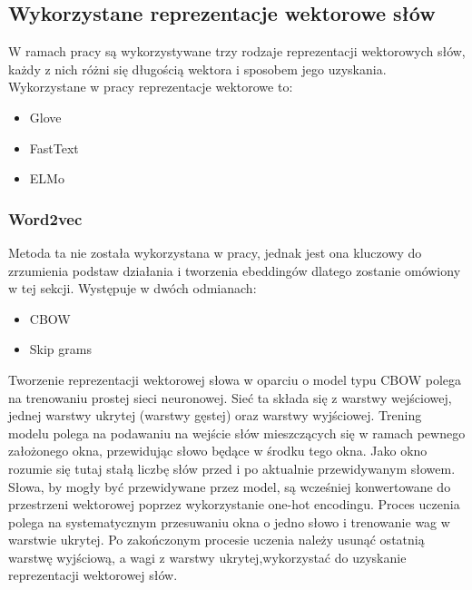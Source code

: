


\subsection{Wykorzystane reprezentacje wektorowe słów}
W ramach pracy są wykorzystywane trzy rodzaje reprezentacji wektorowych słów, każdy z nich różni się długością wektora i sposobem jego uzyskania. Wykorzystane w pracy reprezentacje wektorowe to:
\begin{itemize}
    \item Glove
    \item FastText
    \item ELMo
\end{itemize}



\subsubsection{Word2vec}
Metoda ta nie została wykorzystana w pracy, jednak jest ona kluczowy do zrzumienia podstaw działania i tworzenia ebeddingów dlatego zostanie omówiony w tej sekcji. Występuje w dwóch odmianach:

\begin{itemize}
    \item CBOW
    \item Skip grams
\end{itemize}



\noindent Tworzenie reprezentacji wektorowej słowa w oparciu o model typu CBOW polega na trenowaniu prostej sieci neuronowej. Sieć ta składa się z warstwy wejściowej, jednej warstwy ukrytej (warstwy gęstej) oraz warstwy wyjściowej. Trening modelu polega na podawaniu na wejście słów mieszczących się w ramach pewnego założonego okna, przewidując słowo będące w środku tego okna. Jako okno rozumie się tutaj stałą liczbę słów przed i po aktualnie przewidywanym słowem. Słowa, by mogły być przewidywane przez model, są wcześniej konwertowane do przestrzeni wektorowej poprzez wykorzystanie one-hot encodingu. Proces uczenia polega na systematycznym przesuwaniu okna o jedno słowo i trenowanie wag w warstwie ukrytej. Po zakończonym procesie uczenia należy usunąć ostatnią warstwę wyjściową, a wagi z warstwy ukrytej,wykorzystać do uzyskanie reprezentacji wektorowej słów.\cite{Mikolov2013}

